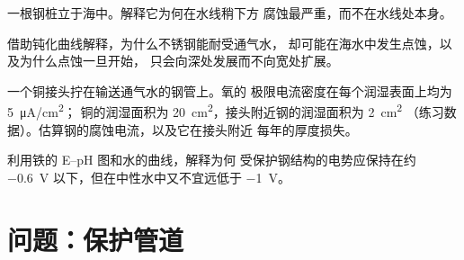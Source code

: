 \begin{exercise}[$\star\star$]\label{exo:b2:corrosion:9}
一根钢桩立于海中。解释它为何在水线稍下方
腐蚀最严重，而不在水线处本身。
\end{exercise}

\begin{exercise}[$\star\star\star$]\label{exo:b2:corrosion:10}
借助钝化曲线解释，为什么不锈钢能耐受通气水，
却可能在海水中发生点蚀，以及为什么点蚀一旦开始，
只会向深处发展而不向宽处扩展。
\end{exercise}

\begin{exercise}[$\star\star\star$]\label{exo:b2:corrosion:11}
一个铜接头拧在输送通气水的钢管上。氧的
极限电流密度在每个润湿表面上均为 \qty{5}{\micro A/cm^2}；
铜的润湿面积为 \qty{20}{cm^2}，接头附近钢的润湿面积为 \qty{2}{cm^2}
（练习数据）。估算钢的腐蚀电流，以及它在接头附近
每年的厚度损失。
\end{exercise}

\begin{exercise}[$\star\star\star$]\label{exo:b2:corrosion:12}
利用铁的 E--pH 图和水的曲线，解释为何
受保护钢结构的电势应保持在约
\qty{-0.6}{V} 以下，但在中性水中又不宜远低于 \qty{-1}{V}。
\end{exercise}

\section{问题：保护管道}

